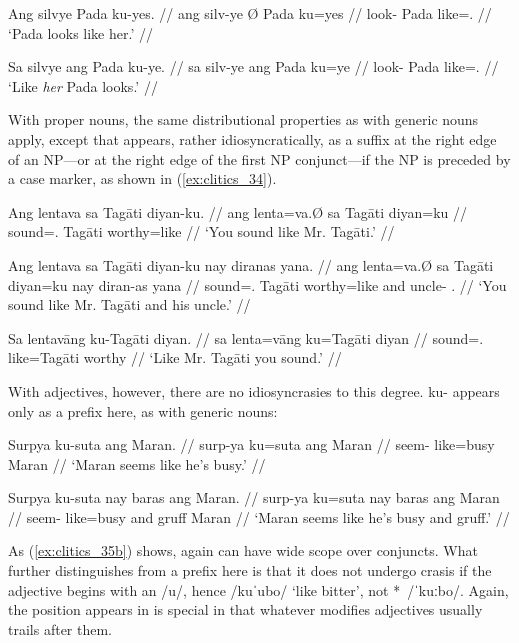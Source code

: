 \pex\label{ex:clitics_33}
\a\label{ex:clitics_33a}\begingl
	\gla Ang silvye {} Pada ku-yes. //
	\glb ang silv-ye Ø Pada ku=yes //
	\glc \AgtT{} look-\TsgF{} \Top{} Pada like=\TsgF{}.\Parg{} //
	\glft `Pada looks like her.' //
\endgl

\a\label{ex:clitics_33b}\begingl
	\gla Sa silvye ang Pada ku-ye. //
	\glb sa silv-ye ang Pada ku=ye //
	\glc \PatT{} look-\TsgF{} \Aarg{} Pada like=\TsgF{}.\Top{} //
	\glft `Like \emph{her} Pada looks.' //
\endgl
\xe

With proper nouns, the same distributional properties as with generic nouns
apply, except that  appears, rather idiosyncratically, as a
suffix at the right edge of an NP---or at the right edge of the first NP
conjunct---if the NP is preceded by a case marker, as shown in
(\ref{ex:clitics_34}).

\pex\label{ex:clitics_34}
\a\label{ex:clitics_34a}\begingl
	\gla Ang lentava sa Tagāti diyan-ku. //
	\glb ang lenta=va.Ø sa Tagāti diyan=ku //
	\glc \AgtT{} sound=\Second{}.\Top{} \Parg{} Tagāti worthy=like //
	\glft `You sound like Mr. Tagāti.' //
\endgl

\a\label{ex:clitics_34b}\begingl
	\gla Ang lentava sa Tagāti diyan-ku nay diranas yana. //
	\glb ang lenta=va.Ø sa Tagāti diyan=ku nay diran-as yana //
	\glc \AgtT{} sound=\Second{}.\Top{} \Parg{} Tagāti worthy=like and 
		uncle-\Parg{} \TsgM{}.\Gen{} //
	\glft `You sound like Mr. Tagāti and his uncle.' //
\endgl

\a\label{ex:clitics_34c}\begingl
	\gla Sa lentavāng ku-​Tagāti diyan. //
	\glb sa lenta=vāng ku=​Tagāti diyan //
	\glc \PatT{} sound=\Second{}.\Aarg{} like=​Tagāti worthy //
	\glft `Like Mr. Tagāti you sound.' //
\endgl
\xe

\label{clitics_preadj_ku}
With adjectives, however, there are no idiosyncrasies to this degree.
 {ku-} appears only as a prefix here, as with generic nouns:

\pex\label{ex:clitics_35}
\a\label{ex:clitics_35a}\begingl
	\gla Surpya ku-suta ang Maran. //
	\glb surp-ya ku=suta ang Maran //
	\glc seem-\TsgM{} like=busy \Aarg{} Maran //
	\glft `Maran seems like he's busy.' //
\endgl

\a\label{ex:clitics_35b}\begingl
	\gla Surpya ku-suta nay baras ang Maran. //
	\glb surp-ya ku=suta nay baras ang Maran //
	\glc seem-\TsgM{} like=busy and gruff \Aarg{} Maran //
	\glft `Maran seems like he's busy and gruff.' //
\endgl
\xe

As (\ref{ex:clitics_35b}) shows,  again can have wide scope over
conjuncts. What further distinguishes  from a prefix here is
that it does not undergo crasis if the adjective begins with an /u/, hence
 /kuˈubo/ `like bitter', not *\,
/ˈkuːbo/. Again, the position  appears in is special in that
whatever modifies adjectives usually trails after them.

